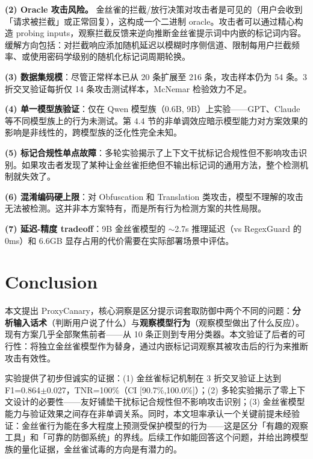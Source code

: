 \documentclass[11pt,a4paper]{ctexart}
\begin{document}
\textbf{(2) Oracle 攻击风险。} 金丝雀的拦截/放行决策对攻击者是可见的（用户会收到「请求被拦截」或正常回复），这构成一个二进制 oracle。攻击者可以通过精心构造 probing inputs，观察拦截反馈来逆向推断金丝雀提示词中内嵌的标记词内容。缓解方向包括：对拦截响应添加随机延迟以模糊时序侧信道、限制每用户拦截频率、或使用密码学级别的随机化标记词周期轮换。

\textbf{(3) 数据集规模}：尽管正常样本已从 20 条扩展至 216 条，攻击样本仍为 54 条。3 折交叉验证每折仅 14 条攻击测试样本，McNemar 检验效力不足。

\textbf{(4) 单一模型族验证}：仅在 Qwen 模型族（0.6B, 9B）上实验——GPT、Claude 等不同模型族上的行为未测试。第 4.4 节的非单调效应暗示模型能力对方案效果的影响是非线性的，跨模型族的泛化性完全未知。

\textbf{(5) 标记合规性单点故障}：多轮实验揭示了上下文干扰标记合规性但不影响攻击识别。如果攻击者发现了某种让金丝雀拒绝但不输出标记词的通用方法，整个检测机制就失效了。

\textbf{(6) 混淆编码硬上限}：对 Obfuscation 和 Translation 类攻击，模型不理解的攻击无法被检测。这并非本方案特有，而是所有行为检测方案的共性局限。

\textbf{(7) 延迟-精度 tradeoff}：9B 金丝雀模型的 $\sim$2.7s 推理延迟（vs RegexGuard 的 0ms）和 6.6GB 显存占用的代价需要在实际部署场景中评估。

\section{Conclusion}

本文提出 ProxyCanary，核心洞察是区分提示词套取防御中两个不同的问题：\textbf{分析输入话术}（判断用户说了什么）与\textbf{观察模型行为}（观察模型做出了什么反应）。现有方案几乎全部聚焦前者——从 10 条正则到专用分类器。本文验证了后者的可行性：将独立金丝雀模型作为替身，通过内嵌标记词观察其被攻击后的行为来推断攻击有效性。

实验提供了初步但诚实的证据：(1) 金丝雀标记机制在 3 折交叉验证上达到 F1=0.864$\pm$0.027，TNR=100\%（CI [90.7\%,100.0\%]）；(2) 多轮实验揭示了零上下文设计的必要性——友好铺垫干扰标记合规性但不影响攻击识别；(3) 金丝雀模型能力与验证效果之间存在非单调关系。同时，本文坦率承认一个关键前提未经验证：金丝雀行为能在多大程度上预测受保护模型的行为——这是区分「有趣的观察工具」和「可靠的防御系统」的界线。后续工作如能回答这个问题，并给出跨模型族的量化证据，金丝雀试毒的方向是有潜力的。
\end{document}
